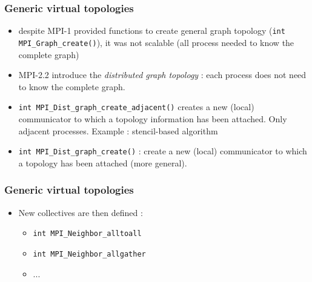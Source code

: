 
%
%


\begin{frame}[containsverbatim]
\frametitle{Generic virtual topologies}
\begin{itemize}
	\item{despite MPI-1 provided functions to create general graph topology (\verb+int MPI_Graph_create()+), it was not scalable (all process needed to know the complete graph)}
	\item{MPI-2.2 introduce the \textit{distributed graph topology} : each process does not need to know the complete graph.}
	\item{\verb+int MPI_Dist_graph_create_adjacent()+ creates a new (local) communicator to which a topology information has been attached. Only adjacent processes. Example : stencil-based algorithm}
	\item{\verb+int MPI_Dist_graph_create()+ : create a new (local) communicator to which a topology has been attached (more general). }
\end{itemize}
\end{frame}

\begin{frame}[containsverbatim]
\frametitle{Generic virtual topologies}
\begin{itemize}
	\item{New collectives are then defined :
		\begin{itemize}
			\item{\verb+int MPI_Neighbor_alltoall+}
			\item{\verb+int MPI_Neighbor_allgather+}
			\item{...}
		\end{itemize}
}
\end{itemize}
\end{frame}


